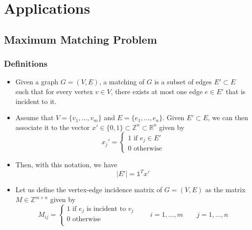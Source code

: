\documentclass[12pt, openany]{report}
\theoremstyle{definition}
\begin{document}
\chapter{Applications}
\section{Maximum Matching Problem}
\subsection{Definitions}
\begin{itemize}
    \item Given a graph \(G=(V,E)\), a matching of \(G\) is a subset of edges \(E'\subset E\) such that for every vertex \(v\in V\), there exists at most one edge \(e\in E'\) that is incident to it.
    \item Assume that \(V=\{v_1,\dots,v_m\}\) and \(E=\{e_1,\dots, e_n\}\). Given \(E'\subset E\), we can then associate it to the vector \(x'\in \{0,1\}\subset \mathbb{Z}^n\subset \mathbb{R}^n\) given by 
    \begin{equation}
        x_j' = \begin{cases}
            1 \text{ if } e_j \in E'\\
            0\text{ otherwise}
        \end{cases}
    \end{equation}
    \item Then, with this notation, we have 
    \begin{equation}
        |E'| = \mathbb{1}^Tx'
    \end{equation}
    \item Let us define the vertex-edge incidence matrix of \(G=(V,E)\) as the matrix \(M\in \mathbb{Z}^{m\times n}\) given by
    \begin{equation}
        M_{ij} = \begin{cases} 1 \text{ if }e_j\text{ is incident to }v_j\\ 0 \text{ otherwise}\\ \end{cases} \qquad i=1,\dots,m\qquad j=1,\dots,n
    \end{equation}
\end{itemize}
\end{document}
